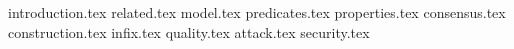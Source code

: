 {introduction.tex}
{related.tex}
{model.tex}
{predicates.tex}
{properties.tex}
{consensus.tex}
{construction.tex}
{infix.tex}
{quality.tex}
{attack.tex}
{security.tex}

